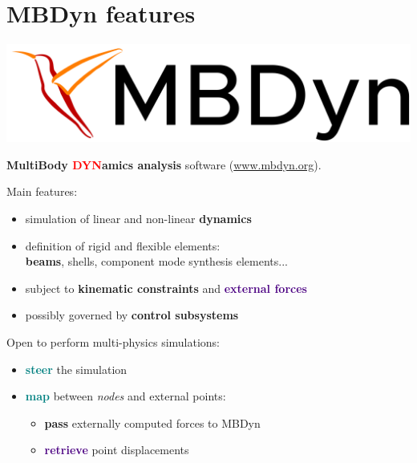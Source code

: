 \documentclass[10pt,t]{beamer}
\begin{document}
\section{MBDyn features}

\begin{frame}{\includegraphics[width=.18\textwidth]{images/mbdyn.png} }

\textbf{\textcolor{dorange}{M}ulti\textcolor{dorange}{B}ody \textcolor{red}{DYN}amics analysis} software (\url{www.mbdyn.org}).\\


\vspace{5mm}

Main features:

    \begin{itemize}
        \item simulation of linear and non-linear \textbf{\textcolor{dorange}{dynamics}}
        \item definition of rigid and flexible elements:\\ \textbf{\textcolor{dblue}{beams}}, shells, component mode synthesis elements...
        \item subject to \textbf{\textcolor{pblue}{kinematic constraints}} and \textbf{\textcolor{indigo}{external forces}}
        \item possibly governed by \textbf{\textcolor{fgreen}{control subsystems}}
    \end{itemize}

\pause
\vspace{5mm}

Open to perform multi-physics simulations:
\begin{itemize}
    \item \textcolor{teal}{\textbf{steer}} the simulation
    \item \textcolor{teal}{\textbf{map}} between \textit{nodes} and external points:
    \begin{itemize}
    \footnotesize
        \item \textcolor{fgreen}{\textbf{pass}} externally computed forces to MBDyn
        \item \textcolor{indigo}{\textbf{retrieve}} point displacements
    \end{itemize}
\end{itemize}

\end{frame}
\end{document}
